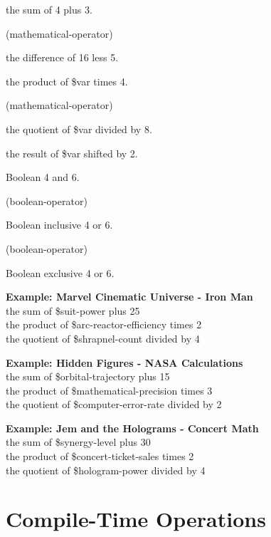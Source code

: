 \documentclass[11pt,letterpaper,oldstylefigures]{memoir}
\newcommand{\stagedir}[1]{#1\par\vspace{1\baselineskip}}
\newenvironment{FountainExample}
  {\begingroup
  \ttfamily\small
   \setlength{\parindent}{0pt}
  \setlength{\parskip}{0.5em}
  \allowdisplaybreaks
  \setlength{\displaywidowpenalty}{0}
  \setlength{\widowpenalty}{0}
  \setlength{\clubpenalty}{0}
  \setlength{\interlinepenalty}{0}
}
  {\endgroup}
\begin{document}
\begin{FountainExample}
\stagedir{the sum of 4 plus 3.} (\gls{mathematical-operator})
\end{FountainExample}
\begin{FountainExample}
\stagedir{the difference of 16 less 5.}
\end{FountainExample}
\begin{FountainExample}
\stagedir{the product of \$var times 4.} (\gls{mathematical-operator})
\end{FountainExample}
\begin{FountainExample}
\stagedir{the quotient of \$var divided by 8.}
\end{FountainExample}
\begin{FountainExample}
\stagedir{the result of \$var shifted by 2.}
\end{FountainExample}
\begin{FountainExample}
\stagedir{Boolean 4 and 6.} (\gls{boolean-operator})
\end{FountainExample}
\begin{FountainExample}
\stagedir{Boolean inclusive 4 or 6.} (\gls{boolean-operator})
\end{FountainExample}
\begin{FountainExample}
\stagedir{Boolean exclusive 4 or 6.}
\end{FountainExample}

\textbf{Example: Marvel Cinematic Universe - Iron Man}\\
the sum of \$suit-power plus 25\\
the product of \$arc-reactor-efficiency times 2\\
the quotient of \$shrapnel-count divided by 4

\textbf{Example: Hidden Figures - NASA Calculations}\\
the sum of \$orbital-trajectory plus 15\\
the product of \$mathematical-precision times 3\\
the quotient of \$computer-error-rate divided by 2

\textbf{Example: Jem and the Holograms - Concert Math}\\
the sum of \$synergy-level plus 30\\
the product of \$concert-ticket-sales times 2\\
the quotient of \$hologram-power divided by 4

\section{Compile-Time Operations}
\end{document}
